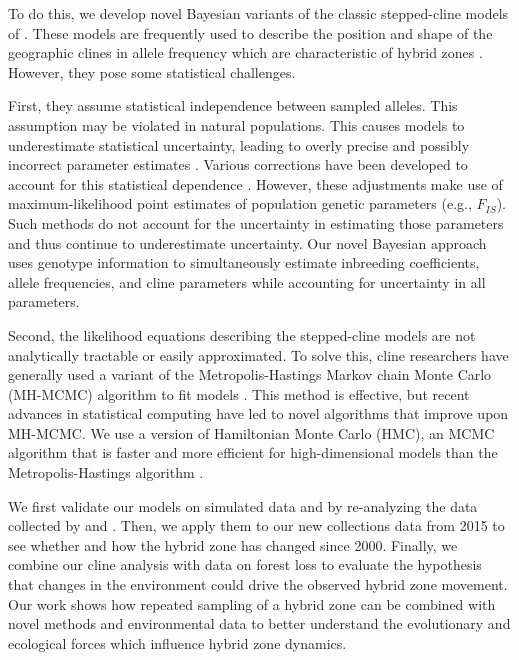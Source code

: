 \documentclass[]{article}
\begin{document}
To do this, we develop novel Bayesian variants of the classic
stepped-cline models of \citet{Szymura:1986cm}. These models are
frequently used to describe the position and shape of the geographic
clines in allele frequency which are characteristic of hybrid zones
\citep{Barton:1993vy}. However, they pose some statistical challenges.

First, they assume statistical independence between sampled alleles.
This assumption may be violated in natural populations. This causes
models to underestimate statistical uncertainty, leading to overly
precise and possibly incorrect parameter estimates
\citep{Szymura:1986cm}. Various corrections have been developed to
account for this statistical dependence
\citep[e.g.,][]{Szymura:1986cm, Phillips:2004cj, Alexandrino:2005vl, Macholan:2008gg}.
However, these adjustments make use of maximum-likelihood point
estimates of population genetic parameters (e.g., \(F_{IS}\)). Such
methods do not account for the uncertainty in estimating those
parameters and thus continue to underestimate uncertainty. Our novel
Bayesian approach uses genotype information to simultaneously estimate
inbreeding coefficients, allele frequencies, and cline parameters while
accounting for uncertainty in all parameters.

Second, the likelihood equations describing the stepped-cline models are
not analytically tractable or easily approximated. To solve this, cline
researchers have generally used a variant of the Metropolis-Hastings
Markov chain Monte Carlo (MH-MCMC) algorithm to fit models
\citep{Szymura:1986cm, Porter:1997ia, Gay:2008jp, Derryberry:2014jw}.
This method is effective, but recent advances in statistical computing
have led to novel algorithms that improve upon MH-MCMC. We use a version
of Hamiltonian Monte Carlo (HMC), an MCMC algorithm that is faster and
more efficient for high-dimensional models than the Metropolis-Hastings
algorithm \citep{Betancourt:2018vd}.

We first validate our models on simulated data and by re-analyzing the
data collected by \citet{Mallet:1986vj} and \citet{Blum:2002wr}. Then,
we apply them to our new collections data from 2015 to see whether and
how the hybrid zone has changed since 2000. Finally, we combine our
cline analysis with data on forest loss to evaluate the hypothesis that
changes in the environment could drive the observed hybrid zone
movement. Our work shows how repeated sampling of a hybrid zone can be
combined with novel methods and environmental data to better understand
the evolutionary and ecological forces which influence hybrid zone
dynamics.
\end{document}
